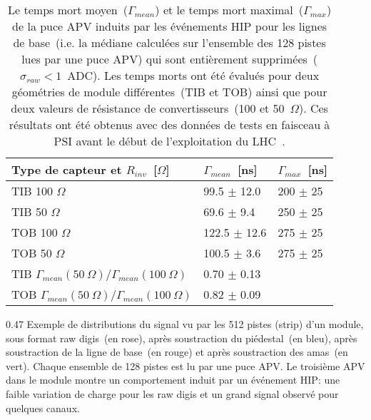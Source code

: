 \begin{table}[h]
\begin{center}
\begin{tabular}{|l|l|l|}
\hline
Type de capteur et $R_{inv}$~[$\Omega$] & $\Gamma_{mean}$~[ns]  & $\Gamma_{max}$~[ns] \\
\hline
\hline
TIB 100 $\Omega$ & 99.5 $\pm$ 12.0 & 200 $\pm$ 25 \\
TIB 50  $\Omega$ & 69.6 $\pm$ 9.4 & 250 $\pm$ 25 \\
TOB 100  $\Omega$ & 122.5 $\pm$ 12.6 & 275 $\pm$ 25 \\
TOB 50 $\Omega$  & 100.5 $\pm$ 3.6 & 275 $\pm$ 25 \\
\hline
TIB $\Gamma_{mean}(50~\Omega )/\Gamma_{mean}(100~\Omega)$ &  0.70 $\pm$ 0.13  & \\
TOB $\Gamma_{mean}(50~\Omega )/\Gamma_{mean}(100~\Omega)$ &  0.82 $\pm$ 0.09 & \\
\hline
\end{tabular}
\caption[Table caption text]{Le temps mort moyen~($\Gamma_{mean} $) et le temps mort maximal~($\Gamma_{max}$) de la puce APV induits par les événements HIP pour les lignes de base~(i.e. la médiane calculées sur l'ensemble des 128 pistes lues par une puce APV) qui sont entièrement supprimées~($\sigma_{raw} <1 $~ADC). Les temps morts ont été évalués pour deux géométries de module différentes~(TIB et TOB) ainsi que pour deux valeurs de résistance de convertisseurs~(100 et 50~$\Omega$). Ces résultats ont été obtenus avec des données de tests en faisceau à PSI avant le début de l'exploitation du LHC~\cite{Bainbridge:2004jc}.}
\label{tab:tableDeadtimes2}
\end{center}
\end{table}


                 {0.47}
                 {Exemple de distributions du signal vu par les 512 pistes (strip) d'un module, sous format raw digis~(en rose), après soustraction du piédestal~(en bleu), après soustraction de la ligne de base~(en rouge) et après soustraction des amas~(en vert). Chaque ensemble de 128 pistes est lu par une puce APV. Le troisième APV dans le module montre un comportement induit par un événement HIP: une faible variation de charge pour les raw digis et un grand signal observé pour quelques canaux.}       %

